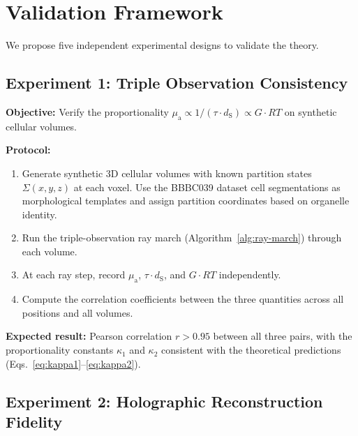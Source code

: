 \documentclass[11pt,twocolumn,a4paper]{article}
\newcommand{\dS}{d_{\mathrm{S}}}
\newcommand{\muabs}{\mu_{\mathrm{a}}}
\begin{document}



\section{Validation Framework}
\label{sec:validation}

We propose five independent experimental designs to validate the
theory.

\subsection{Experiment 1: Triple Observation Consistency}

\textbf{Objective:} Verify the proportionality $\muabs \propto
1/(\tau \cdot \dS) \propto G \cdot RT$ on synthetic cellular volumes.

\textbf{Protocol:}
\begin{enumerate}[label=(\roman*),leftmargin=*]
\item Generate synthetic 3D cellular volumes with known partition
  states $\Sigma(x,y,z)$ at each voxel. Use the BBBC039 dataset
  \citep{bbbc039} cell segmentations as morphological templates and
  assign partition coordinates based on organelle identity.
\item Run the triple-observation ray march
  (Algorithm~\ref{alg:ray-march}) through each volume.
\item At each ray step, record $\muabs$, $\tau \cdot \dS$, and
  $G \cdot RT$ independently.
\item Compute the correlation coefficients between the three
  quantities across all positions and all volumes.
\end{enumerate}

\textbf{Expected result:} Pearson correlation $r > 0.95$ between all
three pairs, with the proportionality constants $\kappa_1$ and
$\kappa_2$ consistent with the theoretical predictions
(Eqs.~\eqref{eq:kappa1}--\eqref{eq:kappa2}).

\subsection{Experiment 2: Holographic Reconstruction Fidelity}
\end{document}
